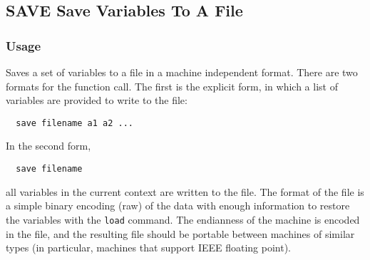 %
%
%
\subsection{SAVE Save Variables To A File}
\subsubsection{Usage}
Saves a set of variables to a file in a machine independent format.
There are two formats for the function call.  The first is the explicit
form, in which a list of variables are provided to write to the file:
\begin{verbatim}
  save filename a1 a2 ...
\end{verbatim}
In the second form,
\begin{verbatim}
  save filename
\end{verbatim}
all variables in the current context are written to the file.  The 
format of the file is a simple binary encoding (raw) of the data
with enough information to restore the variables with the \verb|load|
command.  The endianness of the machine is encoded in the file, and
the resulting file should be portable between machines of similar
types (in particular, machines that support IEEE floating point).
